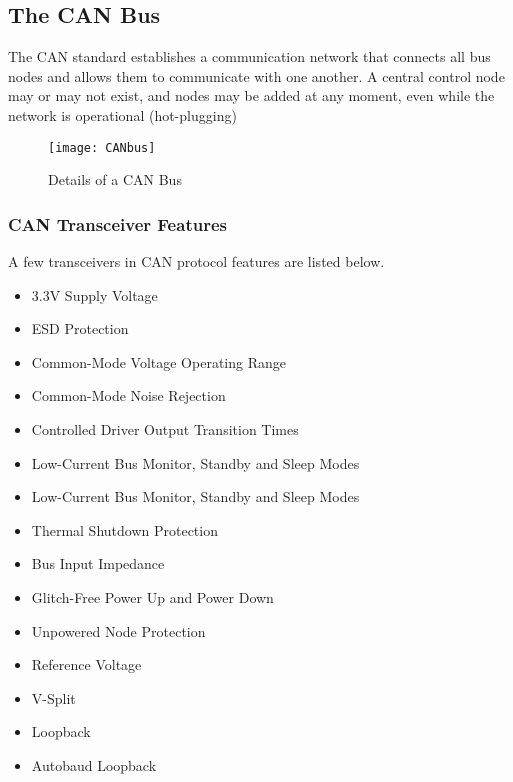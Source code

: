 \subsection{The CAN Bus}

The CAN standard establishes a communication network that connects all bus nodes and allows them to communicate with one another. A central control node may or may not exist, and nodes may be added at any moment, even while the network is operational (hot-plugging)

\begin{figure}[h]
    \centering
    \texttt{[image: CANbus]}
    \caption{ Details of a CAN Bus \cite{b5}}
    \label{fig:CANbus}
\end{figure}

\subsubsection{CAN Transceiver Features}
A few transceivers in CAN protocol features are listed below.
\\
\begin{itemize}
    \item 3.3V Supply Voltage
    \item  ESD Protection
    \item Common-Mode Voltage Operating Range
    \item  Common-Mode Noise Rejection
    \item  Controlled Driver Output Transition Times
    \item  Low-Current Bus Monitor, Standby and Sleep Modes
    \item  Low-Current Bus Monitor, Standby and Sleep Modes
    \item  Thermal Shutdown Protection
    \item  Bus Input Impedance
    \item   Glitch-Free Power Up and Power Down
    \item   Unpowered Node Protection
    \item  Reference Voltage
    \item  V-Split
    \item  Loopback
    \item  Autobaud Loopback
\end{itemize}
 